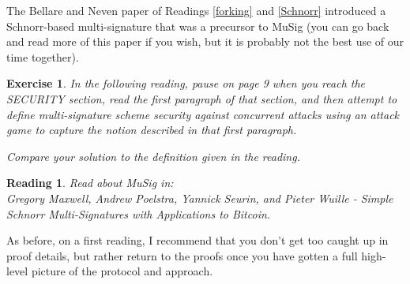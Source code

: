\documentclass[12pt]{article}
\newtheorem{exercise}{Exercise}
\newtheorem{reading}{Reading}
\theoremstyle{definition}
\theoremstyle{remark}
\theoremstyle{definition}
\begin{document}
The Bellare and Neven paper of Readings \ref{forking} and \ref{Schnorr} introduced a Schnorr-based multi-signature that was a precursor to MuSig (you can go back and read more of this paper if you wish, but it is probably not the best use of our time together).

\begin{exercise}
In the following reading, pause on page 9 when you reach the SECURITY section, read the first paragraph of that section, and then attempt to define multi-signature scheme security against concurrent attacks using an attack game to capture the notion described in that first paragraph.

Compare your solution to the definition given in the reading.
\end{exercise}

\begin{reading}
Read about MuSig in:\\
Gregory Maxwell, Andrew Poelstra, Yannick Seurin, and Pieter Wuille - Simple Schnorr Multi-Signatures with Applications to Bitcoin.
\end{reading}

As before, on a first reading, I recommend that you don't get too caught up in proof details, but rather return to the proofs once you have gotten a full high-level picture of the protocol and approach.\\




\end{document}
